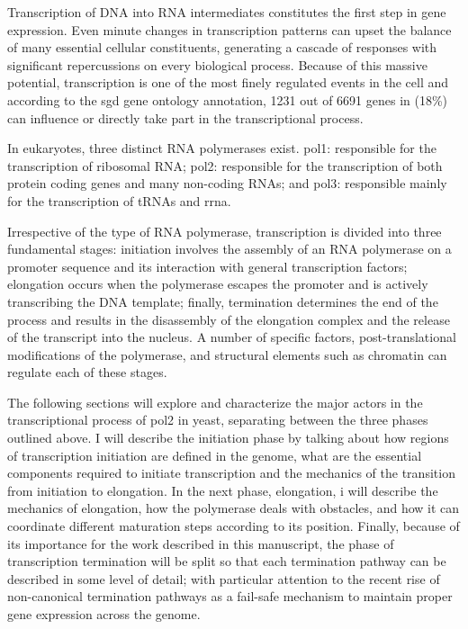
Transcription of DNA into RNA intermediates constitutes the first step in gene expression.
Even minute changes in transcription patterns can upset the balance of many essential cellular constituents, generating a cascade of responses with significant repercussions on every biological process.
Because of this massive potential, transcription is one of the most finely regulated events in the cell and according to the \gls{sgd} \cite{cherry:2012:saccharomyces} gene ontology annotation, 1231 out of 6691 genes in \cer{} (18\%) can influence or directly take part in the transcriptional process.

In eukaryotes, three distinct RNA polymerases exist. \gls{pol1}: responsible for the transcription of ribosomal RNA; \gls{pol2}: responsible for the transcription of both protein coding genes and many non-coding RNAs; and \gls{pol3}: responsible mainly for the transcription of tRNAs and \gls{rrna}. 

Irrespective of the type of RNA polymerase, transcription is divided into three fundamental stages: initiation involves the assembly of an RNA polymerase on a promoter sequence and its interaction with general transcription factors; elongation occurs when the polymerase escapes the promoter and is actively transcribing the DNA template; finally, termination determines the end of the process and results in the disassembly of the elongation complex and the release of the transcript into the nucleus. 
A number of specific factors, post-translational modifications of the polymerase, and structural elements such as chromatin can regulate each of these stages.

The following sections will explore and characterize the major actors in the transcriptional process of \gls{pol2} in yeast, separating between the three phases outlined above.
I will describe the initiation phase by talking about how regions of transcription initiation are defined in the genome, what are the essential components required to initiate transcription and the mechanics of the transition from initiation to elongation.
In the next phase, elongation, i will describe the mechanics of elongation, how the polymerase deals with obstacles, and how it can coordinate different maturation steps according to its position.
Finally, because of its importance for the work described in this manuscript, the phase of transcription termination will be split so that each termination pathway can be described in some level of detail; with particular attention to the recent rise of non-canonical termination pathways as a fail-safe mechanism to maintain proper gene expression across the genome.  